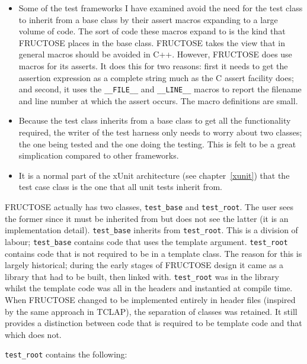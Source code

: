 \documentclass{book}
\begin{document}
\begin{itemize}
\item Some of  the test frameworks I have examined avoid the need for the
test class to inherit from a base class by their
assert macros expanding to a large volume of code.
The sort of code these macros expand to is the kind that FRUCTOSE places
in the base class. FRUCTOSE takes the view that in general macros should
be avoided in C++. However, FRUCTOSE does use macros for its asserts.
It does this for two reasons:
first it needs to get the assertion expression as a complete string much
as the C assert facility does; and second, it uses the {\tt \_\_FILE\_\_}
and {\tt \_\_LINE\_\_} macros to report the filename and line number
at which the assert occurs. The macro definitions are small.

\item Because the test class inherits from a base class to get all
the functionality required, the writer of the test harness only needs
to worry about two classes; the one being tested and the one doing the
testing. This is felt to be a great simplication compared to other
frameworks.

\item It is a normal part of the xUnit architecture 
(see chapter~\ref{xunit})
that the test case class is the one that all unit tests inherit from.
\end{itemize}

FRUCTOSE actually has two classes, {\tt test\_base} and {\tt test\_root}.
The user sees the former since it must be inherited from but does not
see the latter (it is an implementation detail).
{\tt test\_base} inherits from {\tt test\_root}.
This is a division of labour; {\tt test\_base} contains code that uses
the template argument. {\tt test\_root} contains code that is not
required to be in a template class. 
The reason for this is largely historical; during the early stages of
FRUCTOSE design it came as a library that had to be built, then linked with.
{\tt test\_root} was in the library whilst the template code was all in the
headers and instantied at compile time. When FRUCTOSE changed to be
implemented entirely in header files (inspired by the same approach in TCLAP),
the separation of classes was retained. It still provides a distinction 
between code that is required to be template code and that which does not.

{\tt test\_root} contains the following:
\end{document}
